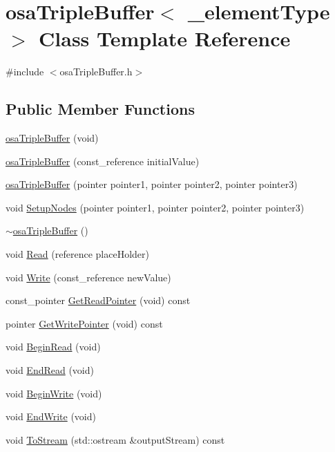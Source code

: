 \hypertarget{classosa_triple_buffer}{}\section{osa\+Triple\+Buffer$<$ \+\_\+element\+Type $>$ Class Template Reference}
\label{classosa_triple_buffer}


{\ttfamily \#include $<$osa\+Triple\+Buffer.\+h$>$}

\subsection*{Public Member Functions}
\begin{DoxyCompactItemize}
\item 
\hyperlink{classosa_triple_buffer_af685c6dd30e1eb800ef6df3f8074ef1a}{osa\+Triple\+Buffer} (void)
\item 
\hyperlink{classosa_triple_buffer_ad60e01d3bf64e9d400107dc6a173a1e3}{osa\+Triple\+Buffer} (const\+\_\+reference initial\+Value)
\item 
\hyperlink{classosa_triple_buffer_a98293e4fbf7257c915c3cd349dd506b5}{osa\+Triple\+Buffer} (pointer pointer1, pointer pointer2, pointer pointer3)
\item 
void \hyperlink{classosa_triple_buffer_acf53979aa3445d7a18060c8ba3facc58}{Setup\+Nodes} (pointer pointer1, pointer pointer2, pointer pointer3)
\item 
\hyperlink{classosa_triple_buffer_a620796ad9891d61a53bc87c87a4796d7}{$\sim$osa\+Triple\+Buffer} ()
\item 
void \hyperlink{classosa_triple_buffer_a3f8542a0f8c276250f14411e85ff2d04}{Read} (reference place\+Holder)
\item 
void \hyperlink{classosa_triple_buffer_a9b988d139edf8aa2eb185917878b711c}{Write} (const\+\_\+reference new\+Value)
\item 
const\+\_\+pointer \hyperlink{classosa_triple_buffer_acce7b1e6b493242c69a7878ee2d2f255}{Get\+Read\+Pointer} (void) const 
\item 
pointer \hyperlink{classosa_triple_buffer_a883eb98a1b7416145c7f5c8081184ebe}{Get\+Write\+Pointer} (void) const 
\item 
void \hyperlink{classosa_triple_buffer_a60ba16dfa7b74ed88998792c195af383}{Begin\+Read} (void)
\item 
void \hyperlink{classosa_triple_buffer_aeafc6d3ce30c02aabd1549cdeb4b21f6}{End\+Read} (void)
\item 
void \hyperlink{classosa_triple_buffer_a59c6f1c56ffac365adf0e219783c9091}{Begin\+Write} (void)
\item 
void \hyperlink{classosa_triple_buffer_a1f71a564e41546875abae049db19dd54}{End\+Write} (void)
\item 
void \hyperlink{classosa_triple_buffer_ab6c93acaa40c01f845dc9f4556e571fa}{To\+Stream} (std\+::ostream \&output\+Stream) const 
\end{DoxyCompactItemize}
